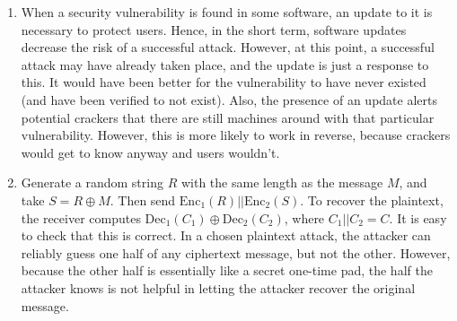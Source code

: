 \documentclass{article}
\begin{document}
\begin{enumerate}
\begin{enumerate}
    \end{enumerate}
  \item
    When a security vulnerability is found in some software, an update to it is necessary to protect users. Hence, in the short term, software updates decrease the risk of a successful attack. However, at this point, a successful attack may have already taken place, and the update is just a response to this. It would have been better for the vulnerability to have never existed (and have been verified to not exist). Also, the presence of an update alerts potential crackers that there are still machines around with that particular vulnerability. However, this is more likely to work in reverse, because crackers would get to know anyway and users wouldn't.
  \item
    Generate a random string $R$ with the same length as the message $M$, and take $S = R \oplus M$. Then send $\mathrm{Enc}_1(R) \mathbin{||} \mathrm{Enc}_2(S)$. To recover the plaintext, the receiver computes $\mathrm{Dec}_1(C_1) \oplus \mathrm{Dec}_2(C_2)$, where $C_1 \mathbin{||} C_2 = C$. It is easy to check that this is correct.
    In a chosen plaintext attack, the attacker can reliably guess one half of any ciphertext message, but not the other. However, because the other half is essentially like a secret one-time pad, the half the attacker knows is not helpful in letting the attacker recover the original message.
\end{enumerate}
\end{document}
